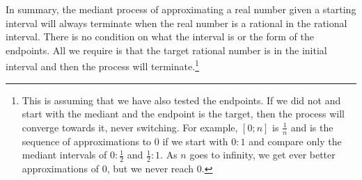 \documentclass[12pt]{article}
\begin{document}
In summary, the mediant process of approximating a real number given a starting interval will always terminate when the real number is a rational in the rational interval. There is no condition on what the interval is or the form of the endpoints. All we require is that the target rational number is in the initial interval and then the process will terminate.\footnote{This is assuming that we have also tested the endpoints. If we did not and start with the mediant and the endpoint is the target, then the process will converge towards it, never switching. For example, $[0; n]$ is $\frac{1}{n}$ and is the sequence of approximations to $0$ if we start with $0:1$ and compare only the mediant intervals of $0:\frac{1}{2}$ and $\frac{1}{2}:1$. As $n$ goes to infinity, we get ever better approximations of $0$, but we never reach $0$.}






\medskip

\normalem %

\printbibliography
\end{document}
